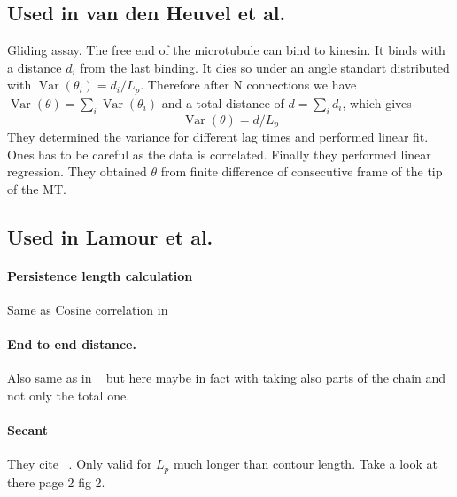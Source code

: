 \documentclass[twocolumn,aps,prxlife,longbibliography,amsmath,amssymb,floatfix,superscriptaddress,showkeys]{revtex4-2}
\begin{document}
\subsection{Used in van den Heuvel et al.~\cite{van_den_heuvel_persistence_2007}}
Gliding assay. The free end of the microtubule can bind to kinesin. It binds with a distance $d_i$ from the last binding. 
It dies so under an angle standart distributed with $\operatorname{Var}(\theta_i) = d_i/L_p$. Therefore after N connections we have
$\operatorname{Var}(\theta)= \sum_i \operatorname{Var}(\theta_i)$ and a total distance of $d=\sum_i d_i$, which gives
\begin{equation}
  \operatorname{Var}(\theta) = d/L_p
\end{equation}
They determined the variance for different lag times and performed linear fit. Ones has to be careful as the data is correlated.
Finally they performed linear regression.
They obtained $\theta$ from finite difference of consecutive frame of the tip of the MT.

\subsection{Used in Lamour et al.~\cite{lamour_easyworm_2014}}
\paragraph{Persistence length calculation}
Same as Cosine correlation in ~\cite{graham_multi-platform_2014}

\paragraph{End to end distance.}
Also same as in ~\cite{graham_multi-platform_2014} but here maybe in fact with taking also parts of the chain and not only the total one.

\paragraph{Secant}
They cite ~\cite{gittes_flexural_1993}.
Only valid for $L_p$ much longer than contour length.
Take a look at there page 2 fig 2.
\end{document}
